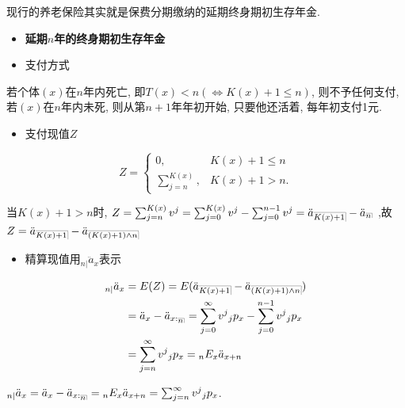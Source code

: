 \documentclass[a4paper,10pt]{ctexbook}
\makeatletter
\newcommand{\hei}{\CJKfamily{hei}}      %
\DeclareRobustCommand{\annu}[1]{_{%
    \def\arraystretch{0}%
    \setlength\arraycolsep{1pt}%
    \setlength\arrayrulewidth{.2pt}%
    \begin{array}[b]{@{}c|}\hline
        \\[\arraycolsep]%
        \scriptstyle #1%
    \end{array}%
}}
\makeatother
\begin{document}
\begin{remark}
    现行的养老保险其实就是保费分期缴纳的延期终身期初生存年金.
\end{remark}

\begin{itemize}
    \item[{\bf\hei 四.}]{\bf\hei 延期$n$年的终身期初生存年金}
\end{itemize}

\begin{itemize}
    \item[{\bf\hei 1.}] 支付方式
\end{itemize}

若个体$(x)$在$n$年内死亡, 即$T(x)<n(\iff K(x)+1\leq n)$, 则不予任何支付, 若$(x)$在$n$年内未死, 则从第$n+1$年年初开始, 只要他还活着, 每年初支付1元.

\begin{itemize}
    \item[{\bf\hei2.}] 支付现值$Z$
\end{itemize}
$$Z =
    \begin{cases}
        0,                 & K(x)+1\leq n \\
        \sum^{K(x)}_{j=n}, & K(x)+1>n.
    \end{cases}
$$

当$K(x)+1>n$时, $Z=\sum^{K(x)}_{j=n}v^{j}=\sum^{K(x)}_{j=0}v^{j}-\sum^{n-1}_{j=0}v^{j}=\ddot a\annu{K(x)+1}-\ddot a\annu n$ ,故$Z=\ddot a\annu{K(x)+1}-\ddot a\annu{(K(x)+1)\land n}$

\begin{itemize}
    \item[{\bf\hei3.}] 精算现值用$_{n|}\ddot a_{x}$表示
\end{itemize}
\begin{align*}
    _{n|}\ddot a_{x} & =E(Z)=E(\ddot a\annu{K(x)+1}-\ddot a\annu{(K(x)+1)\land n})                                           \\
                     & =\ddot a_{x}-\ddot a_{x:\annu n}=\sum^{\infty}_{j=0}v^{j}{}_{j}p_{x}-\sum^{n-1}_{j=0}v^{j}{}_{j}p_{x} \\
                     & =\sum^{\infty}_{j=n}v^{j}{}_{j}p_{x} ={}_{n}E_{x}\ddot a_{x+n}
\end{align*}

\begin{remark}
    $_{n|}\ddot a_{x}=\ddot a_{x}-\ddot a_{x:\annu n}={}_{n}E_{x}\ddot a_{x+n}=\sum^{\infty}_{j=n}v^{j}{}_{j}p_{x}$.
\end{remark}
\end{document}
